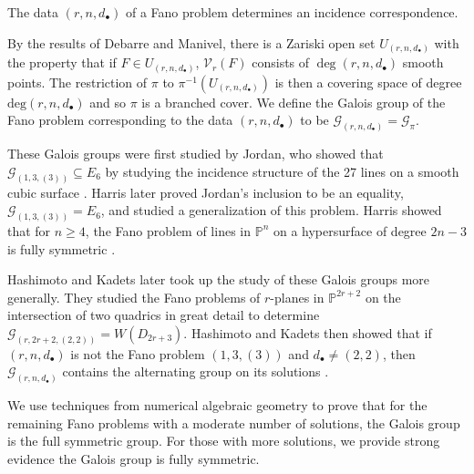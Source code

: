 \documentclass[12pt]{amsart}
\theoremstyle{definition}
\newcommand{\gr}{\mathbb{G}}
\newcommand{\gal}{\mathcal{G}}
\newcommand{\defcolor}[1]{{\color{RoyalBlue}#1}}
\begin{document}
%
The data $(r,n,d_\bullet)$ of a Fano problem determines an incidence correspondence.
\begin{center}
\end{center}
By the results of Debarre and Manivel, there is a Zariski open set $U_{(r,n,d_\bullet)}$ with the property that if $F\in U_{(r,n,d_\bullet)}$, $\mathcal{V}_r(F)$ consists of $\deg(r,n,d_\bullet)$ smooth points. The restriction of $\pi$ to $\pi^{-1}(U_{(r,n,d_\bullet)})$ is then a covering space of degree $\text{deg}(r,n,d_\bullet)$ and so $\pi$ is a branched cover. We define the \defcolor{Galois group} of the Fano problem corresponding to the data $(r,n,d_\bullet)$ to be $\gal_{(r,n,d_\bullet)} = \gal_\pi$. 

These Galois groups were first studied by Jordan, who showed that $\gal_{(1,3,(3))}\subseteq E_6$ by studying the incidence structure of the 27 lines on a smooth cubic surface \cite{Jordan}. Harris later proved Jordan's inclusion to be an equality, $\gal_{(1,3,(3))}= E_6$, and studied a generalization of this problem. Harris showed that for $n\ge 4$, the Fano problem of lines in $\mathbb{P}^n$ on a hypersurface of degree $2n-3$ is fully symmetric \cite{Harris}.

Hashimoto and Kadets later took up the study of these Galois groups more generally. They studied the Fano problems of $r$-planes in $\mathbb{P}^{2r+2}$ on the intersection of two quadrics in great detail to determine $\gal_{(r,2r+2,(2,2))}=W(D_{2r+3})$. Hashimoto and Kadets then showed that if $(r,n,d_\bullet)$ is not the Fano problem $(1,3,(3))$ and $d_\bullet\ne(2,2)$, then $\gal_{(r,n,d_\bullet)}$ contains the alternating group on its solutions \cite{HK}.

We use techniques from numerical algebraic geometry to prove that for the remaining Fano problems with a moderate number of solutions, the Galois group is the full symmetric group. For those with more solutions, we provide strong evidence the Galois group is fully symmetric. 



\end{document}
